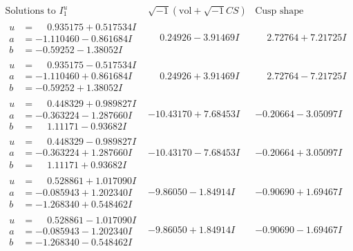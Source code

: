 \documentclass[1p]{elsarticle_modified}
\theoremstyle{definition}
\newcommand{\I}{\sqrt{-1}}
\begin{document}
$$\begin{array}{c|c|c}  
\text{Solutions to }I^u_{1}& \I (\text{vol} + \sqrt{-1}CS) & \text{Cusp shape}\\
 \hline 
\begin{aligned}
u &= \phantom{-}0.935175 + 0.517534 I \\
a &= -1.110460 - 0.861684 I \\
b &= -0.59252 - 1.38052 I\end{aligned}
 & \phantom{-}0.24926 - 3.91469 I & \phantom{-}2.72764 + 7.21725 I \\ \hline\begin{aligned}
u &= \phantom{-}0.935175 - 0.517534 I \\
a &= -1.110460 + 0.861684 I \\
b &= -0.59252 + 1.38052 I\end{aligned}
 & \phantom{-}0.24926 + 3.91469 I & \phantom{-}2.72764 - 7.21725 I \\ \hline\begin{aligned}
u &= \phantom{-}0.448329 + 0.989827 I \\
a &= -0.363224 - 1.287660 I \\
b &= \phantom{-}1.11171 - 0.93682 I\end{aligned}
 & -10.43170 + 7.68453 I & -0.20664 - 3.05097 I \\ \hline\begin{aligned}
u &= \phantom{-}0.448329 - 0.989827 I \\
a &= -0.363224 + 1.287660 I \\
b &= \phantom{-}1.11171 + 0.93682 I\end{aligned}
 & -10.43170 - 7.68453 I & -0.20664 + 3.05097 I \\ \hline\begin{aligned}
u &= \phantom{-}0.528861 + 1.017090 I \\
a &= -0.085943 + 1.202340 I \\
b &= -1.268340 + 0.548462 I\end{aligned}
 & -9.86050 - 1.84914 I & -0.90690 + 1.69467 I \\ \hline\begin{aligned}
u &= \phantom{-}0.528861 - 1.017090 I \\
a &= -0.085943 - 1.202340 I \\
b &= -1.268340 - 0.548462 I\end{aligned}
 & -9.86050 + 1.84914 I & -0.90690 - 1.69467 I \\ \hline\begin{aligned}

\end{aligned}
\end{array}$$
\end{document}

